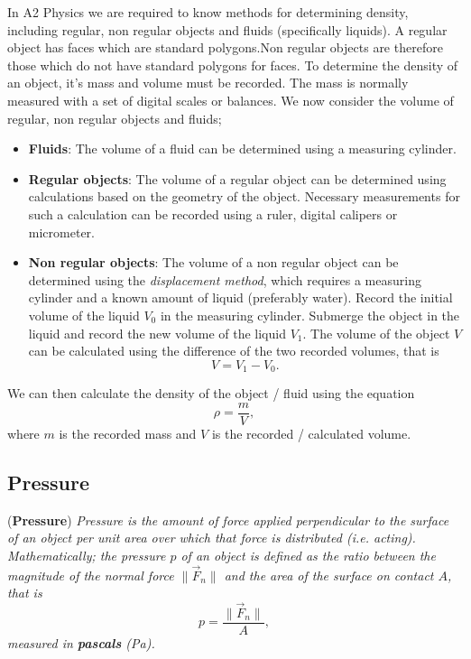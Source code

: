In A2 Physics we are required to know methods for determining density, including regular, non regular objects and fluids (specifically liquids). A regular object has faces which are standard polygons.Non regular objects are therefore those which do not have standard polygons for faces. To determine the density of an object, it's mass and volume must be recorded. The mass is normally measured with a set of digital scales or balances. We now consider the volume of regular, non regular objects and fluids;
\begin{itemize}
    \item \textbf{Fluids}: The volume of a fluid can be determined using a measuring cylinder. 
    \item \textbf{Regular objects}: The volume of a regular object can be determined using calculations based on the geometry of the object. Necessary measurements for such a calculation can be recorded using a ruler, digital calipers or micrometer. 
    \item \textbf{Non regular objects}: The volume of a non regular object can be determined using the \textit{displacement method}, which requires a measuring cylinder and a known amount of liquid (preferably water). Record the initial volume of the liquid $V_0$ in the measuring cylinder. Submerge the object in the liquid and record the new volume of the liquid $V_1$. The volume of the object $V$ can be calculated using the difference of the two recorded volumes, that is
    \begin{equation*}
        V = V_1 - V_0.
    \end{equation*}
\end{itemize} 
We can then calculate the density of the object / fluid using the equation 
\begin{equation*}
    \rho = \frac{m}{V},
\end{equation*}
where $m$ is the recorded mass and $V$ is the recorded / calculated volume. 

\subsection{Pressure}
\label{subsection:pressure}

\begin{definition}{(\textbf{Pressure})}
\textit{Pressure is the amount of force applied \textit{perpendicular} to the surface of an object per unit area over which that force is distributed (i.e. acting). Mathematically; the pressure $p$ of an object is defined as the ratio between the magnitude of the normal force $\| \vec{F}_n \|$ and the area of the surface on contact $A$, that is}
\begin{equation}
    p = \frac{\| \vec{F}_n \|}{A},
\end{equation}
\textit{measured in \textbf{pascals} (Pa).}
\end{definition}

